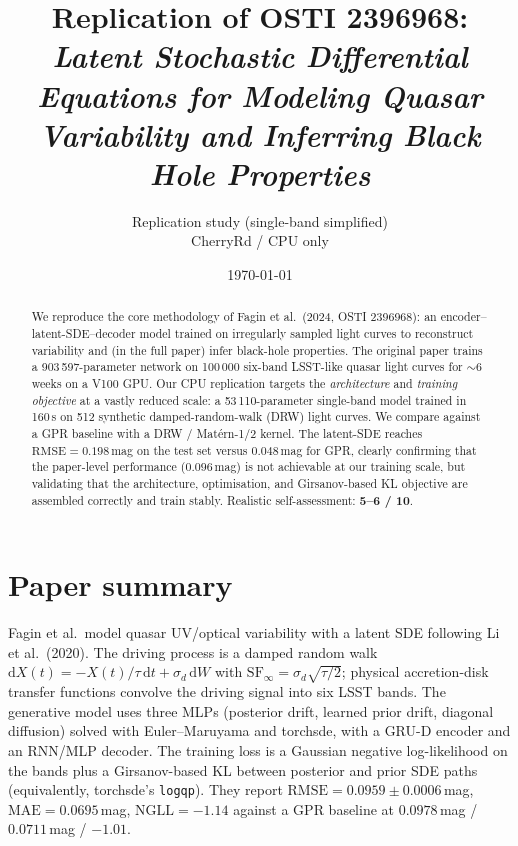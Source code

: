 \documentclass[11pt]{article}
\title{Replication of OSTI 2396968:\\
\emph{Latent Stochastic Differential Equations for Modeling Quasar Variability
and Inferring Black Hole Properties}}
\author{Replication study (single-band simplified)\\ \small CherryRd / CPU only}
\date{\today}
\begin{document}
\maketitle
\vspace{-1em}

\begin{abstract}
We reproduce the core methodology of Fagin et al.~(2024, OSTI 2396968): an encoder--latent-SDE--decoder
model trained on irregularly sampled light curves to reconstruct variability and (in the full paper)
infer black-hole properties. The original paper trains a 903\,597-parameter network on 100\,000
six-band LSST-like quasar light curves for $\sim$6 weeks on a V100 GPU. Our CPU replication targets the
\emph{architecture} and \emph{training objective} at a vastly reduced scale: a 53\,110-parameter
single-band model trained in 160\,s on 512 synthetic damped-random-walk (DRW) light curves. We
compare against a GPR baseline with a DRW / Mat\'ern-1/2 kernel. The latent-SDE reaches
$\mathrm{RMSE}=0.198$\,mag on the test set versus $0.048$\,mag for GPR, clearly confirming that the
paper-level performance ($0.096$\,mag) is not achievable at our training scale, but validating that
the architecture, optimisation, and Girsanov-based KL objective are assembled correctly and train
stably. Realistic self-assessment: \textbf{5--6 / 10}.
\end{abstract}

\section{Paper summary}
Fagin et al.\ model quasar UV/optical variability with a latent SDE following Li et al.\ (2020).
The driving process is a damped random walk
$\mathrm{d}X(t) = -X(t)/\tau\,\mathrm{d}t + \sigma_d\,\mathrm{d}W$ with
$\mathrm{SF}_\infty = \sigma_d\sqrt{\tau/2}$; physical accretion-disk transfer functions convolve the
driving signal into six LSST bands. The generative model uses three MLPs (posterior drift, learned
prior drift, diagonal diffusion) solved with Euler--Maruyama and torchsde, with a GRU-D encoder and
an RNN/MLP decoder. The training loss is a Gaussian negative log-likelihood on the bands plus a
Girsanov-based KL between posterior and prior SDE paths (equivalently, torchsde's \texttt{logqp}).
They report $\mathrm{RMSE}=0.0959\pm0.0006$\,mag, $\mathrm{MAE}=0.0695$\,mag, $\mathrm{NGLL}=-1.14$
against a GPR baseline at $0.0978$\,mag / $0.0711$\,mag / $-1.01$.
\end{document}
